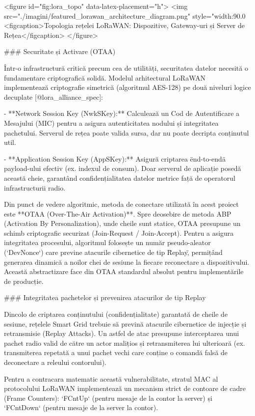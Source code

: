<figure id="fig:lora_topo" data-latex-placement="h">
<img src="./imagini/featured_lorawan_architecture_diagram.png"
style="width:90.0%
<figcaption>Topologia rețelei LoRaWAN: Dispozitive, Gateway-uri și
Server de Rețea</figcaption>
</figure>

### Securitate și Activare (OTAA)

Într-o infrastructură critică precum cea de utilități, securitatea
datelor necesită o fundamentare criptografică solidă. Modelul
arhitectural LoRaWAN implementează criptografie simetrică (algoritmul
AES-128) pe două niveluri logice decuplate [@lora_alliance_spec]:

- **Network Session Key (NwkSKey):** Calculează un Cod de Autentificare
  a Mesajului (MIC) pentru a asigura autenticitatea nodului și
  integritatea pachetului. Serverul de rețea poate valida sursa, dar nu
  poate decripta conținutul util.

- **Application Session Key (AppSKey):** Asigură criptarea
  \"end-to-end\" a payload-ului efectiv (ex. indexul de consum). Doar
  serverul de aplicație posedă această cheie, garantând
  confidențialitatea datelor metrice față de operatorul infrastructurii
  radio.

Din punct de vedere algoritmic, metoda de conectare utilizată în acest
proiect este **OTAA (Over-The-Air Activation)**. Spre deosebire de
metoda ABP (Activation By Personalization), unde cheile sunt statice,
OTAA presupune un schimb criptografic securizat (Join-Request /
Join-Accept). Pentru a asigura integritatea procesului, algoritmul
folosește un număr pseudo-aleator (`DevNonce`) care previne atacurile
cibernetice de tip \"Replay\", permițând generarea dinamică a noilor
chei de sesiune la fiecare reconectare a dispozitivului. Această
abstractizare face din OTAA standardul absolut pentru implementările de
producție.

### Integritatea pachetelor și prevenirea atacurilor de tip Replay

Dincolo de criptarea conținutului (confidențialitate) garantată de
cheile de sesiune, rețelele Smart Grid trebuie să prevină atacurile
cibernetice de injecție și retransmisie (Replay Attacks). Un astfel de
atac presupune interceptarea unui pachet radio valid de către un actor
malițios și retransmiterea lui ulterioară (ex. transmiterea repetată a
unui pachet vechi care conține o comandă falsă de deconectare a releului
contorului).

Pentru a contracara matematic această vulnerabilitate, stratul MAC al
protocolului LoRaWAN implementează un mecanism strict de contoare de
cadre (Frame Counters): `FCntUp` (pentru mesaje de la contor la server)
și `FCntDown` (pentru mesaje de la server la contor).

